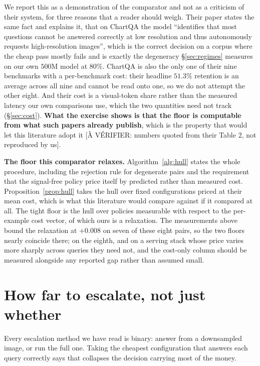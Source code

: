 \documentclass[10pt,twocolumn]{article}
\theoremstyle{plain}
\begin{document}
We report this as a demonstration of the comparator and not as a criticism of
their system, for three reasons that a reader should weigh. Their paper states
the same fact and explains it, that on ChartQA the model ``identifies that most
questions cannot be answered correctly at low resolution and thus autonomously
requests high-resolution images'', which is the correct decision on a corpus
where the cheap pass mostly fails and is exactly the degeneracy
\S\ref{sec:regimes} measures on our own $500$M model at $80\%$. ChartQA is also
the only one of their nine benchmarks with a per-benchmark cost: their headline
$51.3\%$ retention is an average across all nine and cannot be read onto one,
so we do not attempt the other eight. And their cost is a visual-token share
rather than the measured latency our own comparisons use, which the
two quantities need not track (\S\ref{sec:cost}). \textbf{What the exercise
shows is that the floor is computable from what such papers already publish},
which is the property that would let this literature adopt it
[À VÉRIFIER: numbers quoted from their Table 2, not reproduced by us].

\textbf{The floor this comparator relaxes.}
Algorithm~\ref{alg:hull} states the whole procedure, including the rejection
rule for degenerate pairs and the requirement that the signal-free policy price
itself by predicted rather than measured cost.
Proposition~\ref{prop:hull} takes the hull over
fixed configurations priced at their mean cost, which is what this literature
would compare against if it compared at all. The tight floor is the hull over
policies measurable with respect to the per-example cost vector, of which ours
is a relaxation. The measurements above bound the relaxation at $+0.008$ on
seven of these eight pairs, so the two floors nearly coincide there; on the
eighth, and on a serving stack
whose price varies more sharply across queries they need not, and the
cost-only column should be measured alongside any reported gap rather than
assumed small.

\section{How far to escalate, not just whether}
\label{sec:ladder}

Every escalation method we have read is binary: answer from a downsampled image,
or run the full one. Taking the cheapest configuration that answers each query
correctly says that collapses the decision carrying most of the money.
\end{document}
